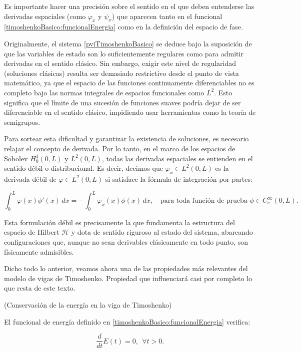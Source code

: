 Es importante hacer una precisión sobre el sentido en el que deben entenderse las derivadas espaciales (como $\varphi_x$ y $\psi_x$) que aparecen tanto en el funcional \eqref{timoshenkoBasico:funcionalEnergia} como en la definición del espacio de fase. 

Originalmente, el sistema \eqref{pviTimoshenkoBasico} se deduce bajo la suposición de que las variables de estado son lo suficientemente regulares como para admitir derivadas en el sentido clásico. Sin embargo, exigir este nivel de regularidad (soluciones clásicas) resulta ser demasiado restrictivo desde el punto de vista matemático, ya que el espacio de las funciones continuamente diferenciables no es completo bajo las normas integrales de espacios funcionales como $L^2$. Esto significa que el límite de una sucesión de funciones suaves podría dejar de ser diferenciable en el sentido clásico, impidiendo usar herramientas como la teoría de semigrupos.

Para sortear esta dificultad y garantizar la existencia de soluciones, es necesario relajar el concepto de derivada. Por lo tanto, en el marco de los espacios de Sobolev $H_0^1(0,L)$ y $L^2(0,L)$, todas las derivadas espaciales se entienden en el sentido débil o distribucional. Es decir, decimos que $\varphi_x \in L^2(0,L)$ es la derivada débil de $\varphi \in L^2(0,L)$ si satisface la fórmula de integración por partes:

\[
\int_0^L \varphi(x) \phi'(x) \, dx = - \int_0^L \varphi_x(x) \phi(x) \, dx, \quad \text{para toda función de prueba } \phi \in C_c^\infty(0,L).
\]

Esta formulación débil es precisamente la que fundamenta la estructura del espacio de Hilbert $\mathcal{H}$ y dota de sentido riguroso al estado del sistema, abarcando configuraciones que, aunque no sean derivables clásicamente en todo punto, son físicamente admisibles.

Dicho todo lo anterior, veamos ahora una de las propiedades más relevantes del modelo de vigas de Timoshenko. Propiedad que influenciará casi por completo lo que resta de este texto.\\

\begin{Proposicion}{(Conservación de la energía en la viga de Timoshenko)}
    \label{ch:timoshenko:prop:ConservacionEnergiaTimoshenkoBasico}

    El funcional de energía definido en \eqref{timoshenkoBasico:funcionalEnergia} verifica:

    \[\frac{d}{dt}E(t) = 0, \ \ \forall t > 0.\]
\end{Proposicion}

